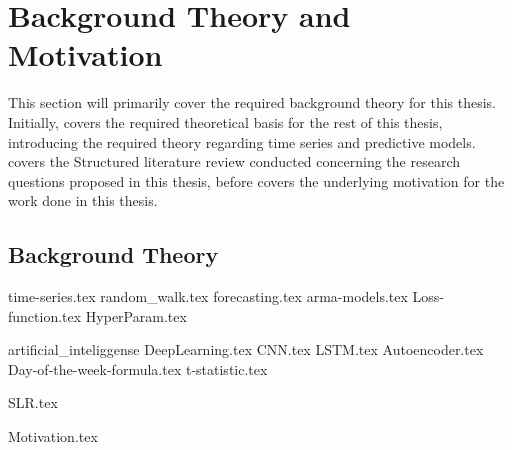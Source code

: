 \chapter{Background Theory and Motivation}
\label{cha:TheoryAndBackground}


This section will primarily cover the required background theory for this thesis.
Initially,  covers the required theoretical basis for the rest of this thesis,
introducing the required theory regarding time series and predictive models.
 covers the Structured literature review conducted concerning the research questions proposed in this thesis,
before  covers the underlying motivation for the work done in this thesis.



\section{Background Theory}
\label{section:BT:BackgroundTheory}
{time-series.tex}
{random_walk.tex}
{forecasting.tex}
{arma-models.tex}
{Loss-function.tex}
{HyperParam.tex}

{artificial_inteliggense}
{DeepLearning.tex}
{CNN.tex}
{LSTM.tex}
{Autoencoder.tex}
{Day-of-the-week-formula.tex}
{t-statistic.tex}



{SLR.tex}


{Motivation.tex}
